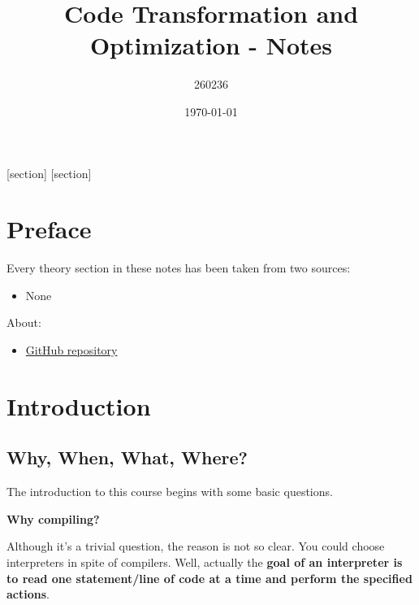 \documentclass[a4paper]{article}
\newcommand{\definition}[1]{\textcolor{Red3}{\textbf{#1}}\index{#1}}
\begin{document}
    [section]
    [section]



    \author{260236}
	\title{Code Transformation and Optimization - Notes}
	\date{\printdayoff\today}
	\maketitle

	\newpage

    \section*{Preface}

    Every theory section in these notes has been taken from two sources:
    \begin{itemize}
        \item None
    \end{itemize}
    About:
    \begin{itemize}
        \item[\faIcon{github}] \href{https://github.com/AndreVale69/HPC-E-PoliMI-university-notes}{GitHub repository}
    \end{itemize}
    
    \newpage
	
	\tableofcontents
	
	\newpage

    \section{Introduction}

    \subsection{Why, When, What, Where?}

    The introduction to this course begins with some basic questions.

    \begin{flushleft}
        \large
        \textcolor{Red3}{\textbf{Why compiling?}}
    \end{flushleft}
    Although it's a trivial question, the reason is not so clear. You could choose interpreters in spite of compilers. Well, actually the \textbf{goal of an \definition{interpreter} is to read one statement/line of code at a time and perform the specified actions}.
\end{document}
